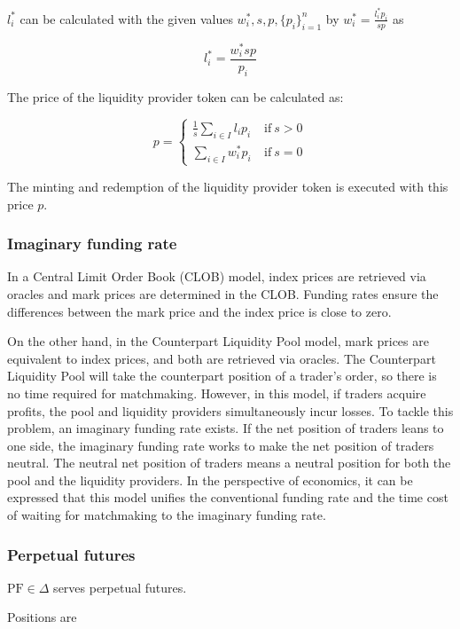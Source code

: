 \documentclass[dvipdfmx]{jsarticle}
\begin{document}
$l_i^*$ can be calculated with the given values $w_i^*, s, p, \{p_i\}_{i=1}^n$ by $w_i^* = \frac{l_i^* p_i}{s p}$ as

$$
  l_i^* = \frac{w_i^* s p}{p_i}
$$

The price of the liquidity provider token can be calculated as:

$$
  p = \left\{
    \begin{aligned}
      \frac{1}{s} \sum_{i \in I} l_i p_i & \ \text{if} \ s > 0 \\
      \sum_{i \in I} w_i^* p_i & \ \text{if} \ s = 0
    \end{aligned}
  \right.
$$

The minting and redemption of the liquidity provider token is executed with this price $p$.

\subsubsection{Imaginary funding rate}

In a Central Limit Order Book (CLOB) model, index prices are retrieved via oracles and mark prices are determined in the CLOB. 
Funding rates ensure the differences between the mark price and the index price is close to zero.

On the other hand, in the Counterpart Liquidity Pool model, mark prices are equivalent to index prices, and both are retrieved via oracles. 
The Counterpart Liquidity Pool will take the counterpart position of a trader’s order, so there is no time required for matchmaking. 
However, in this model, if traders acquire profits, the pool and liquidity providers simultaneously incur losses. 
To tackle this problem, an imaginary funding rate exists. 
If the net position of traders leans to one side, the imaginary funding rate works to make the net position of traders neutral.  
The neutral net position of traders means a neutral position for both the pool and the liquidity providers. 
In the perspective of economics, it can be expressed that this model unifies the conventional funding rate and the time cost of waiting for matchmaking to the imaginary funding rate.

\subsubsection{Perpetual futures}

$\text{PF} \in \Delta$ serves perpetual futures.

Positions are
\end{document}
